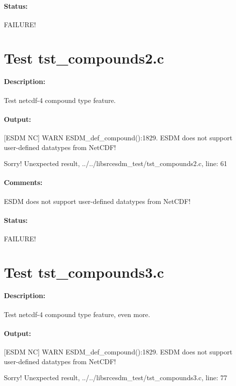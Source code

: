 \paragraph{Status:} FAILURE!

\section{Test tst\_compounds2.c}

\paragraph{Description:} Test netcdf-4 compound type feature.

\paragraph{Output:} [ESDM NC] WARN ESDM\_def\_compound():1829. ESDM does not support user-defined datatypes from NetCDF!

Sorry! Unexpected result, ../../libsrcesdm\_test/tst\_compounds2.c, line: 61

\paragraph{Comments:} ESDM does not support user-defined datatypes from NetCDF!

\paragraph{Status:} FAILURE!

\section{Test tst\_compounds3.c}

\paragraph{Description:} Test netcdf-4 compound type feature, even more.

\paragraph{Output:} [ESDM NC] WARN ESDM\_def\_compound():1829. ESDM does not support user-defined datatypes from NetCDF!

Sorry! Unexpected result, ../../libsrcesdm\_test/tst\_compounds3.c, line: 77

